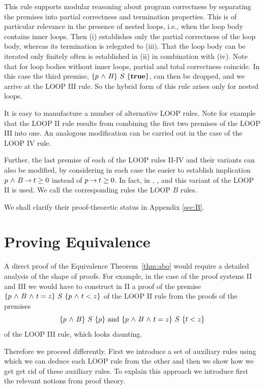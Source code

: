 \documentclass[manuscript, screen, review]{acmart}
\begin{document}
This rule supports modular reasoning about program correctness
by separating the premises into partial correctness and termination
properties.  This is of particular relevance in the presence of nested
loops, i.e., when the loop body contains inner loops.  Then (i)
establishes only the partial correctness of the loop body, whereas its
termination is relegated to (iii). That the loop body can be iterated
only finitely often is established in (ii) in combination with (iv).
Note that for loop bodies without inner loops, partial and total
correctness coincide. In this case the third premise,
$\mbox{$\{{p \mbox{$\ \wedge\ $} B}\}\ {S}\ \{{\mathbf{true}}\}$}$, can then be dropped, and we arrive at
the LOOP III rule. So the hybrid form of this rule arises only for
nested loops.

It is easy to manufacture a number of alternative LOOP rules. 
Note for example that the LOOP II rule results from combining the first two
premises of the LOOP III into one.  An analogous modification can be
carried out in the case of the LOOP IV rule. 

Further, the last premise of each of the LOOP rules II-IV and their
variants can also be modified, by considering in each case the easier
to establish implication $p \mbox{$\ \wedge\ $} B \mbox{$\:\rightarrow\:$} t \geq 0$ instead of
$p \mbox{$\:\rightarrow\:$} t \geq 0$.  In fact, in \cite[page151]{Almeida11}, \cite[page 337]{OG76a}, 
and \cite[page 64]{Rey98} this variant of the LOOP II is used. We call the
corresponding rules the LOOP $B$ rules.

We shall clarify their proof-theoretic status in Appendix \ref{sec:B}.



\section{Proving Equivalence}
\label{sec:proving-equiv}

A direct proof of the Equivalence Theorem~\ref{thm:abo} would require a detailed
analysis of the shape of proofs. For example, in the case of the proof
systems II and III we would have to construct in II a proof of the premise
$ \mbox{$\{{p \mbox{$\ \wedge\ $} B \mbox{$\ \wedge\ $} t=z}\}\ {S}\ \{{p \mbox{$\ \wedge\ $} t<z}\}$}$ of the LOOP II rule from the proofs
of the premises 
\[
 \mbox{$\{{p \mbox{$\ \wedge\ $} B}\}\ {S}\ \{{p}\}$} \mbox{ and } \mbox{$\{{p \mbox{$\ \wedge\ $} B \mbox{$\ \wedge\ $} t=z}\}\ {S}\ \{{t<z}\}$}
\]
of the LOOP III rule, which looks daunting.

Therefore we proceed differently. First we introduce a set of
auxiliary rules using which we can deduce each LOOP rule from the
other and then we show how we get get rid of these auxiliary rules.
To explain this approach we introduce first the relevant notions from
proof theory.
\end{document}
